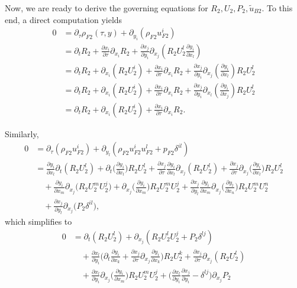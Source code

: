 \documentclass[11pt,twoside,reqno]{amsart}
\numberwithin{equation}{section}
\numberwithin{figure}{section}
\begin{document}
Now, we are ready to derive the governing equations for $R_2,U_2,P_2,\tilde{u}_{B2}$.  To this end, a direct computation yields
\begin{equation}\label{eq:MassConserv}
\begin{aligned}
0&=\partial_\tau\rho_{F2}(\tau,y)+\partial_{y_i}(\rho_{F2}u_{F2}^i)\\
&=\partial_tR_2+\frac{\partial x_i}{\partial\tau}\partial_{x_i}R_2
+\frac{\partial x_j}{\partial y_i}\partial_{x_j}(R_2U_2^l\frac{\partial y_i}{\partial x_l})\\
&=\partial_tR_2+\partial_{x_i}(R_2U_2^i)+\frac{\partial x_i}{\partial\tau}\partial_{x_i}R_2+\frac{\partial x_j}{\partial y_i}\partial_{x_j}(\frac{\partial y_i}{\partial x_l})R_2U_2^l\\&=\partial_tR_2+\partial_{x_i}(R_2U_2^i)+\frac{\partial x_i}{\partial\tau}\partial_{x_i}R_2+\frac{\partial x_j}{\partial y_i}\partial_{x_l}(\frac{\partial y_i}{\partial x_j})R_2U_2^l\\&=\partial_tR_2+\partial_{x_i}(R_2U_2^i)+\frac{\partial x_i}{\partial\tau}\partial_{x_i}R_2.
\end{aligned}
\end{equation}

Similarly,
\begin{equation}
\begin{aligned}
0&=\partial_\tau(\rho_{F2}u_{F2}^i)+\partial_{y_l}(\rho_{F2}u_{F2}^iu_{F2}^l+p_{F2}\delta^{il})\\
&=\frac{\partial y_i}{\partial x_l}\partial_t(R_2U_2^l)
+\partial_t\!\Big(\frac{\partial y_i}{\partial x_l}\Big)R_2U_2^l
+\frac{\partial x_j}{\partial\tau}\frac{\partial y_i}{\partial x_l}\partial_{x_j}(R_2U_2^l)
+\frac{\partial x_j}{\partial\tau}\partial_{x_j}\!\Big(\frac{\partial y_i}{\partial x_l}\Big)R_2U_2^l\\& \quad+\frac{\partial y_i}{\partial x_m}\partial_{x_j}\big(R_2U_2^mU_2^j\big)+\partial_{x_j}\Big(\frac{\partial y_i}{\partial x_m}\Big)R_2U_2^mU_2^j+\frac{\partial x_j}{\partial y_l}\frac{\partial y_i}{\partial x_m}\partial_{x_j}\Big(\frac{\partial y_l}{\partial x_n}\Big)R_2 U_2^m U_2^n\\&\quad+\frac{\partial x_j}{\partial y_l}\partial_{x_j}\Big(P_2\delta^{il}\Big),
\end{aligned}
\end{equation}
which simplifies to
\begin{equation}\label{MometumConserv}
\begin{aligned}
0&=\partial_t(R_2U_2^l)+\partial_{x_j}(R_2U_2^lU_2^j+P_2\delta^{lj})\\
&\quad+\frac{\partial x_l}{\partial y_i}\!\Big(
\partial_t\frac{\partial y_i}{\partial x_k}
+\frac{\partial x_j}{\partial\tau}\partial_{x_j}\frac{\partial y_i}{\partial x_k}\Big)
R_2U_2^k
+\frac{\partial x_j}{\partial\tau}\partial_{x_j}(R_2U_2^l)\\&\quad+\frac{\partial x_l}{\partial y_i}\partial_{x_j}\Big(\frac{\partial y_i}{\partial x_m}\Big)R_2U_2^mU_2^j+\Big(\frac{\partial x_l}{\partial y_i}\frac{\partial x_j}{\partial y_i}-\delta^{lj}\Big)\partial_{x_j}P_2
\end{aligned}
\end{equation}
\end{document}
